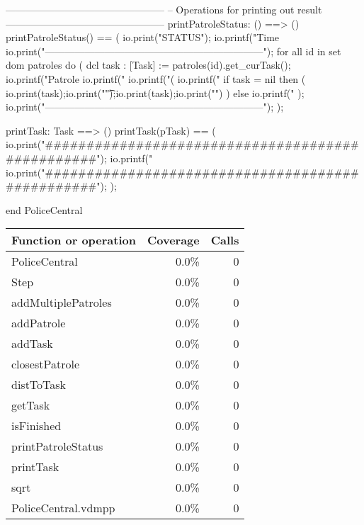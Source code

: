 \documentclass[a4paper]{article}
\begin{document}
\begin{vdm_al}
------------------------------------------------
-- Operations for printing out result
------------------------------------------------
    printPatroleStatus: () ==> ()
    printPatroleStatus() ==
    (
        io.print("STATUS\n");     
        io.printf("Time  %
        io.print("------------------------------------------------------------------\n");
        for all id in set dom patroles do
        (
            dcl task : [Task] := patroles(id).get_curTask();
            io.printf("Patrole %
            io.printf("%
            io.printf("(%
            io.printf("%
            if task = nil
            then 
            (    
                io.print(task);io.print("\t");io.print(task);io.print("\n")
            )
            else io.printf("%
        );
        io.print("------------------------------------------------------------------\n\n");
    );

    printTask: Task ==> ()
    printTask(pTask) ==
        ( 
            io.print("#################################################\n");
            io.printf("%
            io.print("#################################################\n\n");
        );

end PoliceCentral
\end{vdm_al}
\bigskip
\begin{longtable}{|l|r|r|}
\hline
Function or operation & Coverage & Calls \\
\hline
\hline
PoliceCentral & 0.0\% & 0 \\
\hline
Step & 0.0\% & 0 \\
\hline
addMultiplePatroles & 0.0\% & 0 \\
\hline
addPatrole & 0.0\% & 0 \\
\hline
addTask & 0.0\% & 0 \\
\hline
closestPatrole & 0.0\% & 0 \\
\hline
distToTask & 0.0\% & 0 \\
\hline
getTask & 0.0\% & 0 \\
\hline
isFinished & 0.0\% & 0 \\
\hline
printPatroleStatus & 0.0\% & 0 \\
\hline
printTask & 0.0\% & 0 \\
\hline
sqrt & 0.0\% & 0 \\
\hline
\hline
PoliceCentral.vdmpp & 0.0\% & 0 \\
\hline
\end{longtable}
\end{document}
